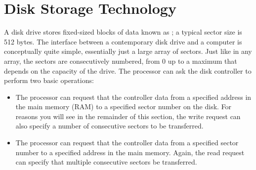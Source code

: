 \section{Disk Storage Technology}\label{disk-storage-technology-section}

A disk drive stores fixed-sized blocks of data known as
; a typical sector size is 512 bytes.  The interface
between a contemporary disk drive and a computer is conceptually quite
simple, essentially just a large array of sectors.  Just like in any
array, the sectors are consecutively numbered, from 0 up to a maximum
that depends on the capacity of the drive.  The processor can ask the
disk controller to perform two basic operations:
\begin{itemize}
\item
The processor can request that the controller  data from a specified address in the
main memory (RAM) to a specified sector number on the
disk.  For reasons you will see in the remainder of this section, the write request can also
specify a number of consecutive sectors to be transferred.
\item
The processor can request that the controller  data from a specified sector number to a specified
address in the main memory.  Again, the
read request can specify that multiple consecutive sectors be
transferred.
\end{itemize}

